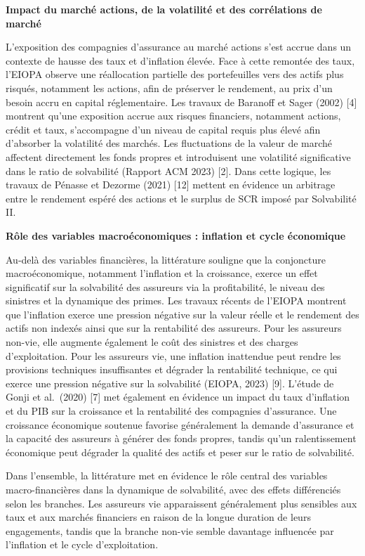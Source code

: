 \documentclass[
]{article}
\begin{document}
\textbf{Impact du marché actions, de la volatilité et des corrélations
de marché}

L'exposition des compagnies d'assurance au marché actions s'est accrue
dans un contexte de hausse des taux et d'inflation élevée. Face à cette
remontée des taux, l'EIOPA observe une réallocation partielle des
portefeuilles vers des actifs plus risqués, notamment les actions, afin
de préserver le rendement, au prix d'un besoin accru en capital
réglementaire. Les travaux de Baranoff et Sager (2002) {[}4{]} montrent
qu'une exposition accrue aux risques financiers, notamment actions,
crédit et taux, s'accompagne d'un niveau de capital requis plus élevé
afin d'absorber la volatilité des marchés. Les fluctuations de la valeur
de marché affectent directement les fonds propres et introduisent une
volatilité significative dans le ratio de solvabilité (Rapport ACM 2023)
{[}2{]}. Dans cette logique, les travaux de Pénasse et Dezorme (2021)
{[}12{]} mettent en évidence un arbitrage entre le rendement espéré des
actions et le surplus de SCR imposé par Solvabilité II.

\textbf{Rôle des variables macroéconomiques : inflation et cycle
économique}

Au-delà des variables financières, la littérature souligne que la
conjoncture macroéconomique, notamment l'inflation et la croissance,
exerce un effet significatif sur la solvabilité des assureurs via la
profitabilité, le niveau des sinistres et la dynamique des primes. Les
travaux récents de l'EIOPA montrent que l'inflation exerce une pression
négative sur la valeur réelle et le rendement des actifs non indexés
ainsi que sur la rentabilité des assureurs. Pour les assureurs non-vie,
elle augmente également le coût des sinistres et des charges
d'exploitation. Pour les assureurs vie, une inflation inattendue peut
rendre les provisions techniques insuffisantes et dégrader la
rentabilité technique, ce qui exerce une pression négative sur la
solvabilité (EIOPA, 2023) {[}9{]}. L'étude de Gonji et al.~(2020)
{[}7{]} met également en évidence un impact du taux d'inflation et du
PIB sur la croissance et la rentabilité des compagnies d'assurance. Une
croissance économique soutenue favorise généralement la demande
d'assurance et la capacité des assureurs à générer des fonds propres,
tandis qu'un ralentissement économique peut dégrader la qualité des
actifs et peser sur le ratio de solvabilité.

Dans l'ensemble, la littérature met en évidence le rôle central des
variables macro-financières dans la dynamique de solvabilité, avec des
effets différenciés selon les branches. Les assureurs vie apparaissent
généralement plus sensibles aux taux et aux marchés financiers en raison
de la longue duration de leurs engagements, tandis que la branche
non-vie semble davantage influencée par l'inflation et le cycle
d'exploitation.
\end{document}

